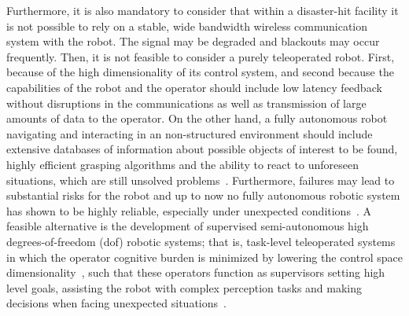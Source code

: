	Furthermore, it is also mandatory to consider that within a disaster-hit facility it is not possible
	to rely on a stable, wide bandwidth wireless communication system with the robot.
	The signal may be degraded and blackouts may occur frequently.
	Then, it is not feasible to consider a purely teleoperated robot.
	First, because of the high dimensionality of its control system, and second because the capabilities of
	the robot and the operator should include low latency feedback without disruptions in the communications
	as well as transmission of large amounts of data to the operator.
	On the other hand, a fully autonomous robot navigating and interacting in an non-structured environment
	should include extensive databases of information about possible objects of interest to be found,
	highly efficient grasping algorithms and the ability to react to unforeseen situations,
	which are still unsolved problems~\cite{Romay}.
	Furthermore, failures may lead to substantial risks for the robot and up to now no fully autonomous robotic
	system has shown to be highly	reliable,	especially under unexpected conditions~\cite{Stormont}.
	A feasible alternative is the development of supervised semi-autonomous high degrees-of-freedom (dof)
	robotic systems; that is, task-level teleoperated systems in which the operator cognitive burden is
	minimized by lowering the control space dimensionality~\cite{Katyal}, such that these operators function
	as supervisors setting high level goals, assisting the robot with complex perception tasks and making
	decisions when facing unexpected situations~\cite{Kohlbrecher}.